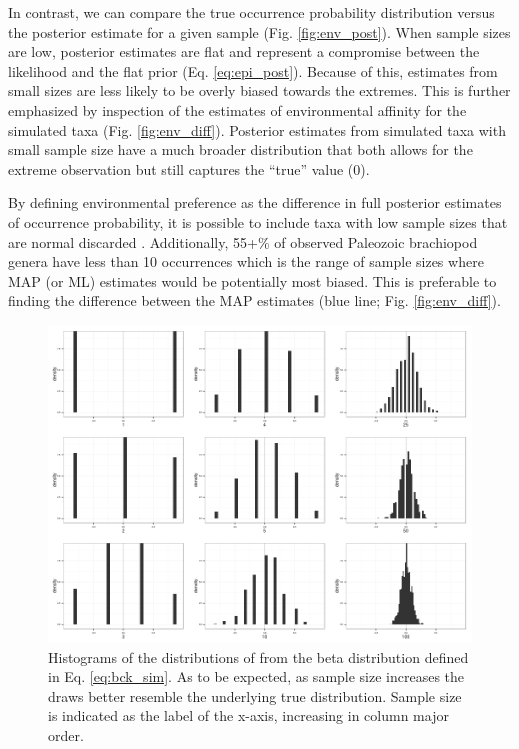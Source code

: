 \documentclass[12pt,letterpaper]{article}
\begin{document}
In contrast, we can compare the true occurrence probability distribution versus the posterior estimate for a given sample (Fig. \ref{fig:env_post}). When sample sizes are low, posterior estimates are flat and represent a compromise between the likelihood and the flat prior (Eq. \ref{eq:epi_post}). Because of this, estimates from small sizes are less likely to be overly biased towards the extremes. This is further emphasized by inspection of the estimates of environmental affinity for the simulated taxa (Fig. \ref{fig:env_diff}). Posterior estimates from simulated taxa with small sample size have a much broader distribution that both allows for the extreme observation but still captures the ``true'' value (0). 


By defining environmental preference as the difference in full posterior estimates of occurrence probability, it is possible to include taxa with low sample sizes that are normal discarded \citep{Foote2006,Miller2001,Simpson2009,Kiessling2007a}. Additionally, 55+\% of observed Paleozoic brachiopod genera have less than 10 occurrences which is the range of sample sizes where MAP (or ML) estimates would be potentially most biased. This is preferable to finding the difference between the MAP estimates (blue line; Fig. \ref{fig:env_diff}).


\begin{figure}[ht]
  \centering
  \includegraphics[height = \textheight,width=\textwidth,keepaspectratio=true]{figure/env_mode_dist}
  \caption{Histograms of the distributions of from the beta distribution defined in Eq. \ref{eq:bck_sim}. As to be expected, as sample size increases the draws better resemble the underlying true distribution. Sample size is indicated as the label of the x-axis, increasing in column major order.}
  \label{fig:env_mode}
\end{figure}
\end{document}
